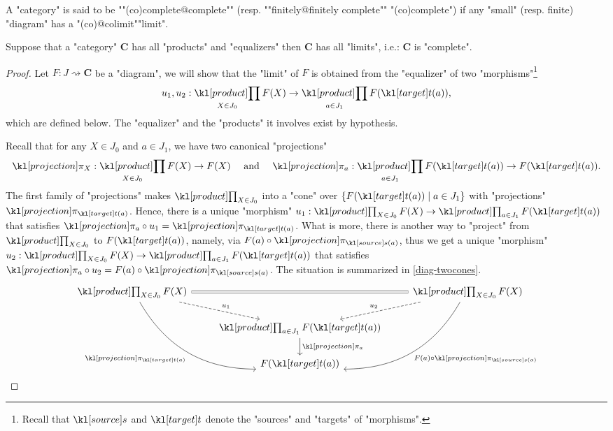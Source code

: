 \documentclass[main.tex]{subfiles}
\begin{document}
\begin{defn}[(Co)completeness]
    \AP A "category" is said to be ""(co)complete@complete"" (resp. ""finitely@finitely complete"" "(co)complete") if any "small" (resp. finite) "diagram" has a "(co)@colimit""limit".
\end{defn}

\begin{thm}\label{thm:prodeqcomplete}
    Suppose that a "category" $\mathbf{C}$ has all "products" and "equalizers" then $\mathbf{C}$ has all "limits", i.e.: $\mathbf{C}$ is "complete".
\end{thm}
\begin{proof}
    Let $F: J\rightsquigarrow \mathbf{C}$ be a "diagram", we will show that the "limit" of $F$ is obtained from the "equalizer" of two "morphisms"\footnote{Recall that $\source$ and $\target$ denote the "sources" and "targets" of "morphisms".}
    \[u_1, u_2: \Product_{X \in J_0} F(X) \rightarrow \Product_{a \in J_1} F(\target(a)),\]
    which are defined below. The "equalizer" and the "products" it involves exist by hypothesis.
    
    Recall that for any $X \in J_0$ and $a \in J_1$, we have two canonical "projections" \[\projection_X:\Product_{X \in J_0}F(X)\rightarrow F(X) \quad \text{ and }\quad \projection_a:\Product_{a \in J_1} F(\target(a)) \rightarrow F(\target(a)).\]
    The first family of "projections" makes $\Product_{X \in J_0}$ into a "cone" over $\{F(\target(a)) \mid a \in J_1\}$ with "projections" $\projection_{\target(a)}$. Hence, there is a unique "morphism" $u_1:\Product_{X \in J_0} F(X) \rightarrow \Product_{a \in J_1}F(\target(a))$ that satisfies $\projection_a \circ u_1 = \projection_{\target(a)}$. What is more, there is another way to "project" from $\Product_{X \in J_0}$ to $F(\target(a))$, namely, via $F(a) \circ \projection_{\source(a)}$, thus we get a unique "morphism" $u_2:\Product_{X \in J_0} F(X) \rightarrow \Product_{a \in J_1}F(\target(a))$ that satisfies $\projection_a \circ u_2 = F(a) \circ \projection_{\source(a)}$. The situation is summarized in \eqref{diag-twocones}.
    \begin{equation}\label{diag-twocones}
        \begin{tikzcd}
            \Product_{X \in J_0} F(X) \arrow[rdd, "\projection_{\target(a)}"', bend right] \arrow[rd, "u_1", dashed] \arrow[rr, equal] & & \Product_{X \in J_0} F(X) \arrow[ldd, "F(a) \circ \projection_{\source(a)}", bend left] \arrow[ld, "u_2"', dashed] \\& \Product_{a \in J_1} F(\target(a)) \arrow[d, "\projection_{a}"] &\\ & F(\target(a)) &         
            \end{tikzcd}
    \end{equation}
    

\end{proof}
\end{document}
